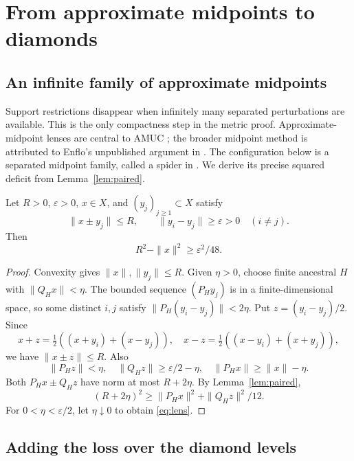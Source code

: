 \section{From approximate midpoints to diamonds}\label{sec:diamonds}

\subsection{An infinite family of approximate midpoints}

Support restrictions disappear when infinitely many separated
perturbations are available. This is the only compactness step in the
metric proof. Approximate-midpoint lenses are central to AMUC
\cite[Theorem~2.1]{DKRRZ2016}; the broader midpoint method is attributed
to Enflo's unpublished argument in \cite[Section~4]{BaudierEtAl2017}.
The configuration below is a separated midpoint family, called a spider
in \cite[Definition~3.7; Definition~6.15 and Proposition~6.16]{BassetLancienProchazka2026}.
We derive its precise squared deficit from Lemma~\ref{lem:paired}.

\begin{lemma}\label{lem:lens}
Let $R>0$, $\varepsilon>0$, $x\in X$, and $(y_j)_{j\ge1}\subset X$ satisfy
\[
 \|x\pm y_j\|\le R,\qquad\|y_i-y_j\|\ge\varepsilon>0
 \quad(i\ne j).
\]
Then
\begin{equation}\label{eq:lens}
 R^2-\|x\|^2\ge\varepsilon^2/48.
\end{equation}
\end{lemma}

\begin{proof}
Convexity gives $\|x\|,\|y_j\|\le R$. Given $\eta>0$, choose
finite ancestral $H$ with $\|Q_Hx\|<\eta$. The bounded sequence
$(P_Hy_j)$ is in a finite-dimensional space, so some distinct $i,j$
satisfy $\|P_H(y_i-y_j)\|<2\eta$. Put $z=(y_i-y_j)/2$.
Since
\[
 x+z=\tfrac12((x+y_i)+(x-y_j)),\quad
 x-z=\tfrac12((x-y_i)+(x+y_j)),
\]
we have $\|x\pm z\|\le R$. Also
\[
 \|P_Hz\|<\eta,\quad\|Q_Hz\|\ge\varepsilon/2-\eta,
 \quad\|P_Hx\|\ge\|x\|-\eta.
\]
Both $P_Hx\pm Q_Hz$ have norm at most $R+2\eta$. By Lemma~\ref{lem:paired},
\[
 (R+2\eta)^2\ge\|P_Hx\|^2+\|Q_Hz\|^2/12.
\]
For $0<\eta<\varepsilon/2$, let $\eta\downarrow0$ to obtain \eqref{eq:lens}.
\end{proof}

\subsection{Adding the loss over the diamond levels}

